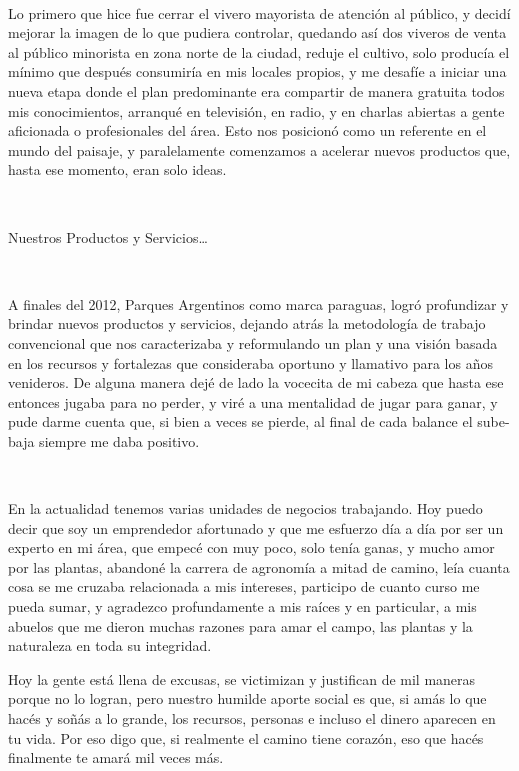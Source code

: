 ~

Lo primero que hice fue cerrar el vivero mayorista de atención al
público, y decidí mejorar la imagen de lo que pudiera controlar,
quedando así dos viveros de venta al público minorista en zona norte de
la ciudad, reduje el cultivo, solo producía el mínimo que después
consumiría en mis locales propios, y me desafíe a iniciar una nueva
etapa donde el plan predominante era compartir de manera gratuita todos
mis conocimientos, arranqué en televisión, en radio, y en charlas
abiertas a gente aficionada o profesionales del área. Esto nos posicionó
como un referente en el mundo del paisaje, y paralelamente comenzamos a
acelerar nuevos productos que, hasta ese momento, eran solo ideas.

~

Nuestros Productos y Servicios\ldots{}

~

A finales del 2012, Parques Argentinos como marca paraguas, logró
profundizar y brindar nuevos productos y servicios, dejando atrás la
metodología de trabajo convencional que nos caracterizaba y reformulando
un plan y una visión basada en los recursos y fortalezas que consideraba
oportuno y llamativo para los años venideros. De alguna manera dejé de
lado la vocecita de mi cabeza que hasta ese entonces jugaba para no
perder, y viré a una mentalidad de jugar para ganar, y pude darme cuenta
que, si bien a veces se pierde, al final de cada balance el sube-baja
siempre me daba positivo.

~

En la actualidad tenemos varias unidades de negocios trabajando. Hoy
puedo decir que soy un emprendedor afortunado y que me esfuerzo día a
día por ser un experto en mi área, que empecé con muy poco, solo tenía
ganas, y mucho amor por las plantas, abandoné la carrera de agronomía a
mitad de camino, leía cuanta cosa se me cruzaba relacionada a mis
intereses, participo de cuanto curso me pueda sumar, y agradezco
profundamente a mis raíces y en particular, a mis abuelos que me dieron
muchas razones para amar el campo, las plantas y la naturaleza en toda
su integridad.

Hoy la gente está llena de excusas, se victimizan y justifican de mil
maneras porque no lo logran, pero nuestro humilde aporte social es que,
si amás lo que hacés y soñás a lo grande, los recursos, personas e
incluso el dinero aparecen en tu vida. Por eso digo que, si realmente el
camino tiene corazón, eso que hacés finalmente te amará mil veces más.

